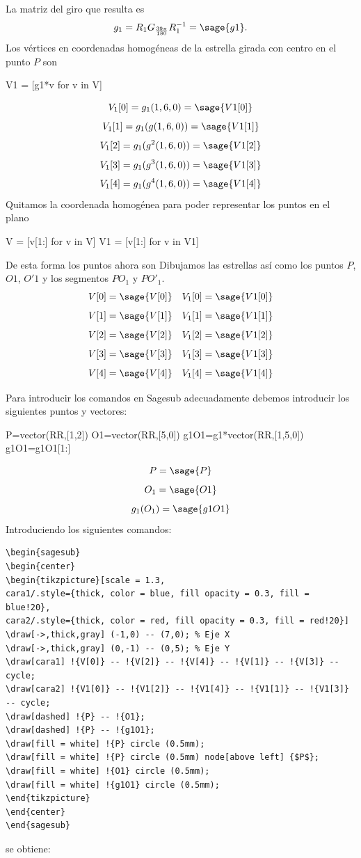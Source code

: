 \documentclass{amsart}
\begin{document}
La matriz del giro que resulta es \[g_1=R_1G_{\frac{39 \pi}{180}}R_1^{-1} = \sage{g1}.\] 
Los vértices en coordenadas homogéneas de la estrella girada con centro en el punto $P$ son

\begin{sageblock}
V1 = [g1*v for v in V]
\end{sageblock}
$$V_1[0]=g_1(1,6,0)=\sage{V1[0]}$$
$$V_1[1]=g_1(g(1,6,0))=\sage{V1[1]}$$
$$V_1[2]=g_1(g^2(1,6,0))=\sage{V1[2]}$$
$$V_1[3]=g_1(g^3(1,6,0))=\sage{V1[3]}$$
$$V_1[4]=g_1(g^4(1,6,0))=\sage{V1[4]}$$
Quitamos la coordenada homogénea para poder representar los puntos en el plano

\begin{sageblock}
V = [v[1:] for v in V]
V1 = [v[1:] for v in V1]
\end{sageblock}
De esta forma los puntos ahora son
Dibujamos las estrellas así como los puntos $P$, $O1$, $O'1$ y los segmentos $PO_1$ y $PO'_1$.
$$V[0]=\sage{V[0]} \quad V_1[0]=\sage{V1[0]}$$
$$V[1]=\sage{V[1]} \quad V_1[1]=\sage{V1[1]}$$
$$V[2]=\sage{V[2]} \quad V_1[2]=\sage{V1[2]}$$
$$V[3]=\sage{V[3]} \quad V_1[3]=\sage{V1[3]}$$
$$V[4]=\sage{V[4]} \quad V_1[4]=\sage{V1[4]}$$

Para introducir los comandos en Sagesub adecuadamente debemos introducir los siguientes puntos y vectores:
\begin{sageblock}
P=vector(RR,[1,2])
O1=vector(RR,[5,0])
g1O1=g1*vector(RR,[1,5,0])
g1O1=g1O1[1:]
\end{sageblock}
$$P=\sage{P}$$
$$O_1=\sage{O1}$$
$$g_1(O_1)=\sage{g1O1}$$
Introduciendo los siguientes comandos:
\begin{verbatim}
\begin{sagesub}
\begin{center}
\begin{tikzpicture}[scale = 1.3,
cara1/.style={thick, color = blue, fill opacity = 0.3, fill = blue!20},
cara2/.style={thick, color = red, fill opacity = 0.3, fill = red!20}]
\draw[->,thick,gray] (-1,0) -- (7,0); % Eje X
\draw[->,thick,gray] (0,-1) -- (0,5); % Eje Y
\draw[cara1] !{V[0]} -- !{V[2]} -- !{V[4]} -- !{V[1]} -- !{V[3]} -- cycle;
\draw[cara2] !{V1[0]} -- !{V1[2]} -- !{V1[4]} -- !{V1[1]} -- !{V1[3]} -- cycle;
\draw[dashed] !{P} -- !{O1};
\draw[dashed] !{P} -- !{g1O1};
\draw[fill = white] !{P} circle (0.5mm);
\draw[fill = white] !{P} circle (0.5mm) node[above left] {$P$};  
\draw[fill = white] !{O1} circle (0.5mm); 
\draw[fill = white] !{g1O1} circle (0.5mm); 
\end{tikzpicture}
\end{center}
\end{sagesub}
\end{verbatim}
se obtiene:
\end{document}
